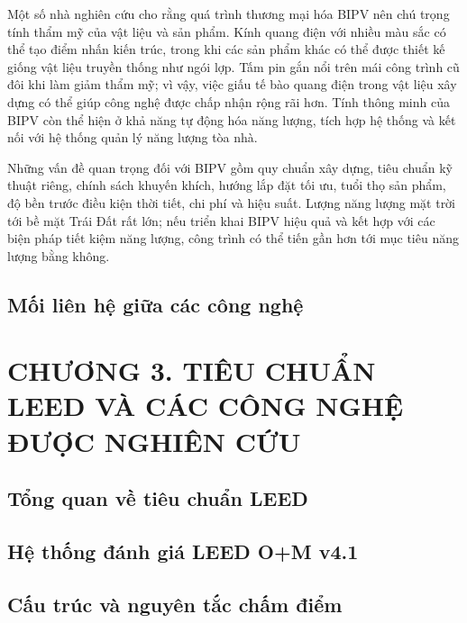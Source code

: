 \documentclass{thesis}
\begin{document}
Một số nhà nghiên cứu cho rằng quá trình thương mại hóa BIPV nên chú
trọng tính thẩm mỹ của vật liệu và sản phẩm. Kính quang điện với
nhiều màu sắc có thể tạo điểm nhấn kiến trúc, trong khi các sản phẩm
khác có thể được thiết kế giống vật liệu truyền thống như ngói lợp.
Tấm pin gắn nổi trên mái công trình cũ đôi khi làm giảm thẩm mỹ; vì
vậy, việc giấu tế bào quang điện trong vật liệu xây dựng có thể giúp
công nghệ được chấp nhận rộng rãi hơn. Tính thông minh của BIPV còn
thể hiện ở khả năng tự động hóa năng lượng, tích hợp hệ thống và kết
nối với hệ thống quản lý năng lượng tòa nhà.

Những vấn đề quan trọng đối với BIPV gồm quy chuẩn xây dựng, tiêu
chuẩn kỹ thuật riêng, chính sách khuyến khích, hướng lắp đặt tối ưu,
tuổi thọ sản phẩm, độ bền trước điều kiện thời tiết, chi phí và hiệu
suất. Lượng năng lượng mặt trời tới bề mặt Trái Đất rất lớn; nếu
triển khai BIPV hiệu quả và kết hợp với các biện pháp tiết kiệm năng
lượng, công trình có thể tiến gần hơn tới mục tiêu năng lượng bằng không.

\subsection{Mối liên hệ giữa các công nghệ}

\newpage

\section*{CHƯƠNG 3. TIÊU CHUẨN LEED VÀ CÁC CÔNG NGHỆ ĐƯỢC NGHIÊN CỨU}
{} %

\setcounter{section}{3}
\setcounter{subsection}{0}
\setcounter{figure}{0}
\setcounter{table}{0}

\subsection{Tổng quan về tiêu chuẩn LEED}
\subsection{Hệ thống đánh giá LEED O+M v4.1}
\subsection{Cấu trúc và nguyên tắc chấm điểm}
\end{document}
